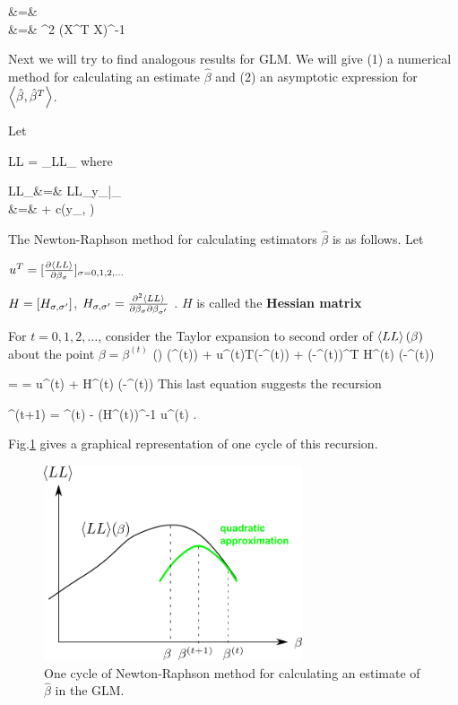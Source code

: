 \beqa
{}
&=&
\\
&=&
\s^2  (X^T X)^{-1}
\eeqa

Next
we will try to find analogous results for GLM.
We will give (1) a numerical method
for calculating an estimate
$\hat{\beta}$
and (2) an asymptotic
expression for
$\left\langle\hat{\beta}, \hat{\beta}^T\right\rangle$.

Let

\beq
 LL =  \sum_\s  LL_\s
\eeq
where

\beqa
 LL_\s &=&   LL_{y_\s|\theta_\s }
\\
&=&
 + c(y_\s, \phi)
\eeqa

The
Newton-Raphson method for calculating
estimators $\hat{\beta}$ is as follows. Let

$u^T = [\frac{\partial\left\langle LL\right\rangle}{\partial\beta_\sigma}]_{\sigma=0,1,2, \ldots}$

 $H= [H_{\sigma, \sigma'}]$, $H_{\sigma, \sigma'} =
\frac{\partial^2 \left\langle LL\right\rangle }{\partial\beta_\sigma\partial\beta_{\sigma'}}$ .
$H$ is called the {\bf Hessian matrix}

For $t=0, 1, 2,\ldots$, consider the
Taylor expansion  to second order
of $\left\langle LL\right\rangle(\beta)$  about  the
point $\beta= \beta^{(t)}$
\beq
{}(\beta)
\approx
{}(\beta^{(t)})
+ u^{(t)T}(\beta-\beta^{(t)})
+ 
(\beta-\beta^{(t)})^T H^{(t)} (\beta-\beta^{(t)})
\eeq

 =
=
u^{(t)}
+
H^{(t)} (\beta-\beta^{(t)})
\eeq
This last equation suggests the recursion

\beq
\beta^{(t+1)} =
\beta^{(t)} -  (H^{(t)})^{-1} u^{(t)}
\;.
\eeq

Fig.\ref{fig-gml-new-rap}
gives a graphical
representation of
one cycle of this recursion.


\begin{figure}[h!]
\centering
\includegraphics[width=3in]
{gen-lin-mod/gen-lin-mod.png}
\caption{One cycle of Newton-Raphson method
for calculating an estimate of $\hat{\beta}$ in the GLM.}
\label{fig-gml-new-rap}
\end{figure}




